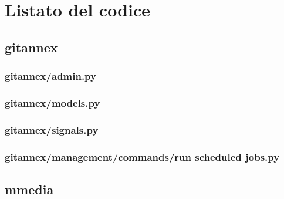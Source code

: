 \chapter{Listato del codice}
\label{AppendiceA}


\section{gitannex}

\subsection{gitannex/admin.py}


\subsection{gitannex/models.py}


\subsection{gitannex/signals.py}


\subsection{gitannex/management/commands/run scheduled jobs.py}



\section{mmedia}

